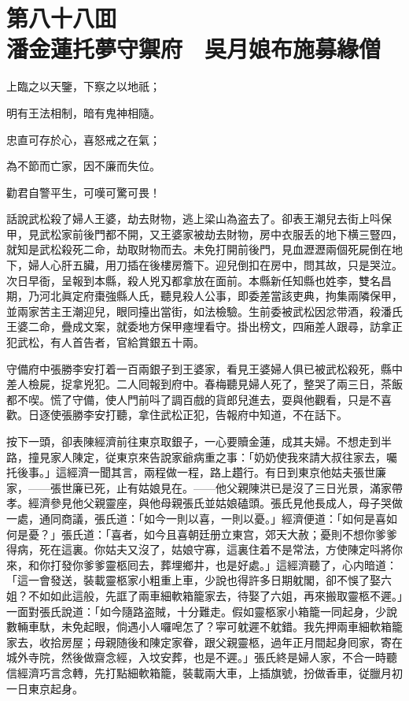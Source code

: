 
\chapter*{第八十八囬　\\潘金蓮托夢守禦府　吳月娘布施募緣僧}


\begin{myquote}
上臨之以天鑒，下察之以地祇；

明有王法相制，暗有鬼神相隨。

忠直可存於心，喜怒戒之在氣；

為不節而亡家，因不廉而失位。

勸君自警平生，可嘆可驚可畏！
\end{myquote}

話說武松殺了婦人王婆，劫去財物，逃上梁山為盗去了。卻表王潮兒去街上呌保甲，見武松家前後門都不開，又王婆家被劫去財物，房中衣服丢的地下横三豎四，就知是武松殺死二命，劫取財物而去。未免打開前後門，見血瀝瀝兩個死屍倒在地下，婦人心肝五臟，用刀插在後樓房簷下。迎兒倒扣在房中，問其故，只是哭泣。次日早衙，呈報到本縣，殺人兇刄都拿放在面前。本縣新任知縣也姓李，雙名昌期，乃河北眞定府棗強縣人氏，聽見殺人公事，即委差當該吏典，拘集兩隣保甲，並兩家苦主王潮迎兒，眼同擡出當街，如法檢驗。生前委被武松因忿带酒，殺潘氏王婆二命，疊成文案，就委地方保甲瘞埋看守。掛出榜文，四廂差人跟尋，訪拿正犯武松，有人首告者，官給賞銀五十兩。

守備府中張勝李安打着一百兩銀子到王婆家，看見王婆婦人俱已被武松殺死，縣中差人檢屍，捉拿兇犯。二人囘報到府中。春梅聽見婦人死了，整哭了兩三日，茶飯都不喫。慌了守備，使人門前呌了調百戲的貨郎兒進去，耍與他觀看，只是不喜歡。日逐使張勝李安打聽，拿住武松正犯，告報府中知道，不在話下。

按下一頭，卻表陳經濟前往東京取銀子，一心要贖金蓮，成其夫婦。不想走到半路，撞見家人陳定，従東京來告說家爺病重之事：「奶奶使我來請大叔往家去，囑托後事。」這經濟一聞其言，兩程做一程，路上趲行。有日到東京他姑夫張世廉家，——張世廉已死，止有姑娘見在。——他父親陳洪已是沒了三日光景，滿家帶孝。經濟參見他父親靈座，與他母親張氏並姑娘磕頭。張氏見他長成人，母子哭做一處，通同商議，張氏道：「如今一則以喜，一則以憂。」經濟便道：「如何是喜如何是憂？」張氏道：「喜者，如今且喜朝廷册立東宫，郊天大赦；憂則不想你爹爹得病，死在這裏。你姑夫又沒了，姑娘守寡，這裏住着不是常法，方使陳定呌將你來，和你打發你爹爹靈柩囘去，葬埋鄉井，也是好處。」這經濟聽了，心内暗道：「這一會發送，裝載靈柩家小粗重上車，少說也得許多日期躭閣，卻不悞了娶六姐？不如如此這般，先誆了兩車細軟箱籠家去，待娶了六姐，再來搬取靈柩不遲。」一面對張氏說道：「如今隨路盗賊，十分難走。假如靈柩家小箱籠一同起身，少說數輛車馱，未免起眼，倘遇小人囉唣怎了？寜可躭遲不躭錯。我先押兩車細軟箱籠家去，收拾房屋；母親随後和陳定家眷，跟父親靈柩，過年正月間起身囘家，寄在城外寺院，然後做齋念經，入坟安葬，也是不遲。」張氏終是婦人家，不合一時聽信經濟巧言念轉，先打點細軟箱籠，裝載兩大車，上插旗號，扮做香車，従臘月初一日東京起身。

